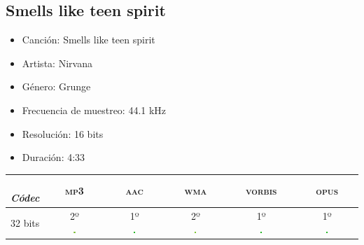 \documentclass[11pt,a4paper]{article}
\begin{document}
\subsection{Smells like teen spirit}

\begin{itemize}
	\item Canción: Smells like teen spirit
	\item Artista: Nirvana
	\item Género: Grunge
	\item Frecuencia de muestreo: 44.1 kHz
	\item Resolución: 16 bits
	\item Duración: 4:33
\end{itemize}

\begin{table}[H]
\centering
\begin{tabular}{|c|c|c|c|c|c|}
\hline
\diagbox[width=15em]{Resolución}{\\\textit{Códec}} & \textsc{ mp3 } & \textsc{ aac } & \textsc{ wma } & \textsc{vorbis} & \textsc{ opus } \\ \hline

32 bits & \makecell{2º\\ \includegraphics[width=0.03\textwidth]{b.png}} & \makecell{1º\\ \includegraphics[width=0.03\textwidth]{mb.png}} & \makecell{2º\\ \includegraphics[width=0.03\textwidth]{b.png}} & \makecell{1º\\ \includegraphics[width=0.03\textwidth]{mb.png}} & \makecell{1º\\ \includegraphics[width=0.03\textwidth]{mb.png}} \\ \hline
 

\end{tabular}
\end{table}
\end{document}
